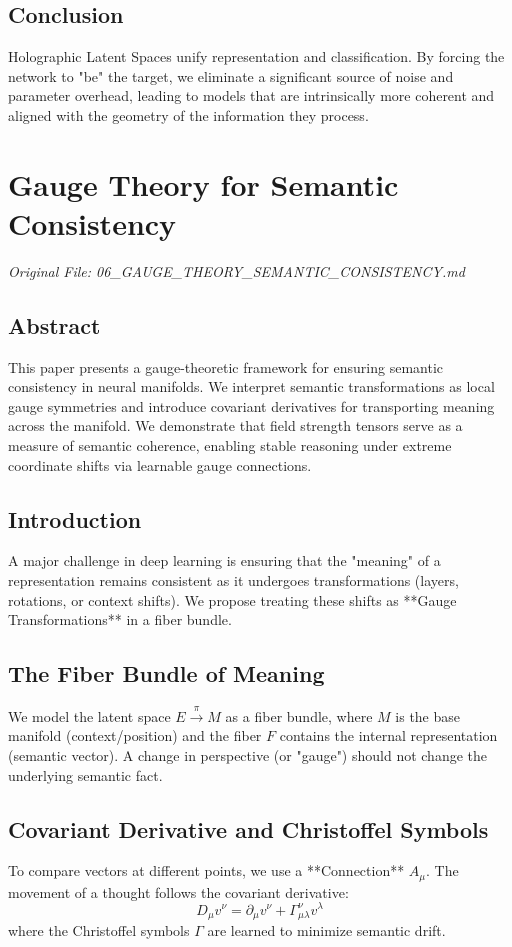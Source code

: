 \documentclass[11pt,a4paper]{report}
\begin{document}
\section{Conclusion}
Holographic Latent Spaces unify representation and classification. By forcing the network to "be" the target, we eliminate a significant source of noise and parameter overhead, leading to models that are intrinsically more coherent and aligned with the geometry of the information they process.

\chapter{Gauge Theory for Semantic Consistency}
\textit{Original File: 06\_GAUGE\_THEORY\_SEMANTIC\_CONSISTENCY.md}

\section{Abstract}
This paper presents a gauge-theoretic framework for ensuring semantic consistency in neural manifolds. We interpret semantic transformations as local gauge symmetries and introduce covariant derivatives for transporting meaning across the manifold. We demonstrate that field strength tensors serve as a measure of semantic coherence, enabling stable reasoning under extreme coordinate shifts via learnable gauge connections.

\section{Introduction}
A major challenge in deep learning is ensuring that the "meaning" of a representation remains consistent as it undergoes transformations (layers, rotations, or context shifts). We propose treating these shifts as **Gauge Transformations** in a fiber bundle.

\section{The Fiber Bundle of Meaning}
We model the latent space $E \xrightarrow{\pi} M$ as a fiber bundle, where $M$ is the base manifold (context/position) and the fiber $F$ contains the internal representation (semantic vector).
A change in perspective (or "gauge") should not change the underlying semantic fact.

\section{Covariant Derivative and Christoffel Symbols}
To compare vectors at different points, we use a **Connection** $A_\mu$. The movement of a thought follows the covariant derivative:
\begin{equation}
    D_\mu v^\nu = \partial_\mu v^\nu + \Gamma^\nu_{\mu\lambda} v^\lambda
\end{equation}
where the Christoffel symbols $\Gamma$ are learned to minimize semantic drift.
\end{document}
